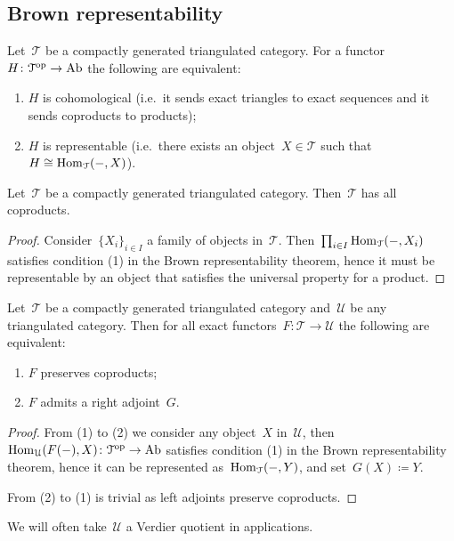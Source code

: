\documentclass[10pt,a4paper]{article}
\begin{document}
\subsection{Brown representability}
\begin{theorem}
  Let~$\mathcal{T}$ be a compactly generated triangulated category. For a functor~$H\colon\mathcal{T}^{\mathrm{op}}\to\mathrm{Ab}$ the following are equivalent:
  \begin{enumerate}
    \item $H$ is cohomological (i.e.\ it sends exact triangles to exact sequences and it sends coproducts to products);
    \item $H$ is representable (i.e.\ there exists an object~$X\in\mathcal{T}$ such that~$H\cong\operatorname{Hom}_{\mathcal{T}}(-,X)$).
  \end{enumerate}
\end{theorem}
\begin{corollary}
  Let~$\mathcal{T}$ be a compactly generated triangulated category. Then~$\mathcal{T}$ has all coproducts.
  \begin{proof}
    Consider~$\{X_i\}_{i\in I}$ a family of objects in~$\mathcal{T}$. Then~$\prod_{i\in I}\operatorname{Hom}_{\mathcal{T}}(-,X_i)$ satisfies condition (1) in the Brown representability theorem, hence it must be representable by an object that satisfies the universal property for a product.
  \end{proof}
\end{corollary}
\begin{corollary}
  Let~$\mathcal{T}$ be a compactly generated triangulated category and~$\mathcal{U}$ be any triangulated category. Then for all exact functors~$F\colon\mathcal{T}\to\mathcal{U}$ the following are equivalent:
  \begin{enumerate}
    \item $F$ preserves coproducts;
    \item $F$ admits a right adjoint~$G$.
  \end{enumerate}
  \begin{proof}
    From (1) to (2) we consider any object~$X$ in~$\mathcal{U}$, then~$\operatorname{Hom}_{\mathcal{U}}(F(-),X)\colon\mathcal{T}^{\mathrm{op}}\to\mathrm{Ab}$ satisfies condition (1) in the Brown representability theorem, hence it can be represented as~$\operatorname{Hom}_{\mathcal{T}}(-,Y)$, and set~$G(X)\coloneqq Y$.

    From (2) to (1) is trivial as left adjoints preserve coproducts.
  \end{proof}
\end{corollary}
We will often take~$\mathcal{U}$ a Verdier quotient in applications.
\end{document}
